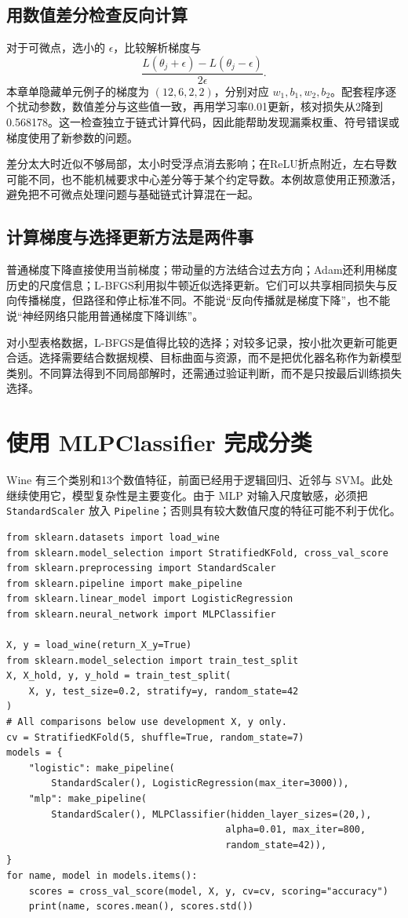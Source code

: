 \subsection{用数值差分检查反向计算}
对于可微点，选小的 $\epsilon$，比较解析梯度与
\[
\frac{L(\theta_j+\epsilon)-L(\theta_j-\epsilon)}{2\epsilon}.
\]
本章单隐藏单元例子的梯度为 $(12,6,2,2)$，分别对应 $w_1,b_1,w_2,b_2$。配套程序逐个扰动参数，数值差分与这些值一致，再用学习率0.01更新，核对损失从2降到0.568178。这一检查独立于链式计算代码，因此能帮助发现漏乘权重、符号错误或梯度使用了新参数的问题。

差分太大时近似不够局部，太小时受浮点消去影响；在ReLU折点附近，左右导数可能不同，也不能机械要求中心差分等于某个约定导数。本例故意使用正预激活，避免把不可微点处理问题与基础链式计算混在一起。

\subsection{计算梯度与选择更新方法是两件事}
普通梯度下降直接使用当前梯度；带动量的方法结合过去方向；Adam还利用梯度历史的尺度信息；L-BFGS利用拟牛顿近似选择更新。它们可以共享相同损失与反向传播梯度，但路径和停止标准不同。不能说“反向传播就是梯度下降”，也不能说“神经网络只能用普通梯度下降训练”。

对小型表格数据，L-BFGS是值得比较的选择；对较多记录，按小批次更新可能更合适。选择需要结合数据规模、目标曲面与资源，而不是把优化器名称作为新模型类别。不同算法得到不同局部解时，还需通过验证判断，而不是只按最后训练损失选择。

\section{使用 MLPClassifier 完成分类}
Wine 有三个类别和13个数值特征，前面已经用于逻辑回归、近邻与 SVM。此处继续使用它，模型复杂性是主要变化。由于 MLP 对输入尺度敏感，必须把 \texttt{StandardScaler} 放入 \texttt{Pipeline}；否则具有较大数值尺度的特征可能不利于优化。

\begin{lstlisting}[caption={Wine：逻辑回归与 MLP 的统一交叉验证比较}]
from sklearn.datasets import load_wine
from sklearn.model_selection import StratifiedKFold, cross_val_score
from sklearn.preprocessing import StandardScaler
from sklearn.pipeline import make_pipeline
from sklearn.linear_model import LogisticRegression
from sklearn.neural_network import MLPClassifier

X, y = load_wine(return_X_y=True)
from sklearn.model_selection import train_test_split
X, X_hold, y, y_hold = train_test_split(
    X, y, test_size=0.2, stratify=y, random_state=42
)
# All comparisons below use development X, y only.
cv = StratifiedKFold(5, shuffle=True, random_state=7)
models = {
    "logistic": make_pipeline(
        StandardScaler(), LogisticRegression(max_iter=3000)),
    "mlp": make_pipeline(
        StandardScaler(), MLPClassifier(hidden_layer_sizes=(20,),
                                       alpha=0.01, max_iter=800,
                                       random_state=42)),
}
for name, model in models.items():
    scores = cross_val_score(model, X, y, cv=cv, scoring="accuracy")
    print(name, scores.mean(), scores.std())
\end{lstlisting}

